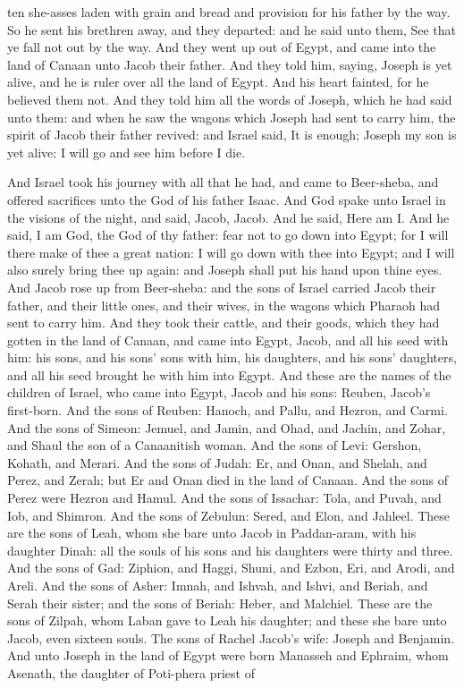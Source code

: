 ten she-asses laden with grain and bread and provision for his father by the way. So he sent his brethren away, and they departed: and he said unto them, See that ye fall not out by the way. And they went up out of Egypt, and came into the land of Canaan unto Jacob their father. And they told him, saying, Joseph is yet alive, and he is ruler over all the land of Egypt. And his heart fainted, for he believed them not. And they told him all the words of Joseph, which he had said unto them: and when he saw the wagons which Joseph had sent to carry him, the spirit of Jacob their father revived: and Israel said, It is enough; Joseph my son is yet alive: I will go and see him before I die. 

And Israel took his journey with all that he had, and came to Beer-sheba, and offered sacrifices unto the God of his father Isaac. And God spake unto Israel in the visions of the night, and said, Jacob, Jacob. And he said, Here am I. And he said, I am God, the God of thy father: fear not to go down into Egypt; for I will there make of thee a great nation: I will go down with thee into Egypt; and I will also surely bring thee up again: and Joseph shall put his hand upon thine eyes. And Jacob rose up from Beer-sheba: and the sons of Israel carried Jacob their father, and their little ones, and their wives, in the wagons which Pharaoh had sent to carry him. And they took their cattle, and their goods, which they had gotten in the land of Canaan, and came into Egypt, Jacob, and all his seed with him: his sons, and his sons’ sons with him, his daughters, and his sons’ daughters, and all his seed brought he with him into Egypt.  And these are the names of the children of Israel, who came into Egypt, Jacob and his sons: Reuben, Jacob’s first-born. And the sons of Reuben: Hanoch, and Pallu, and Hezron, and Carmi. And the sons of Simeon: Jemuel, and Jamin, and Ohad, and Jachin, and Zohar, and Shaul the son of a Canaanitish woman. And the sons of Levi: Gershon, Kohath, and Merari. And the sons of Judah: Er, and Onan, and Shelah, and Perez, and Zerah; but Er and Onan died in the land of Canaan. And the sons of Perez were Hezron and Hamul. And the sons of Issachar: Tola, and Puvah, and Iob, and Shimron. And the sons of Zebulun: Sered, and Elon, and Jahleel. These are the sons of Leah, whom she bare unto Jacob in Paddan-aram, with his daughter Dinah: all the souls of his sons and his daughters were thirty and three. And the sons of Gad: Ziphion, and Haggi, Shuni, and Ezbon, Eri, and Arodi, and Areli. And the sons of Asher: Imnah, and Ishvah, and Ishvi, and Beriah, and Serah their sister; and the sons of Beriah: Heber, and Malchiel. These are the sons of Zilpah, whom Laban gave to Leah his daughter; and these she bare unto Jacob, even sixteen souls. The sons of Rachel Jacob’s wife: Joseph and Benjamin. And unto Joseph in the land of Egypt were born Manasseh and Ephraim, whom Asenath, the daughter of Poti-phera priest of 